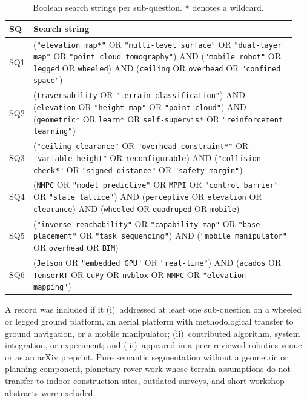 \documentclass[11pt,a4paper]{article}
\begin{document}
\begin{table}[h]
\centering
\footnotesize
\caption{Boolean search strings per sub-question. \texttt{*} denotes a
wildcard.}
\label{tab:retrieval}
\begin{tabular}{@{}p{0.04\linewidth}p{0.90\linewidth}@{}}
\toprule
SQ & Search string \\
\midrule
SQ1 & (\texttt{"elevation map*"} OR \texttt{"multi-level surface"} OR
       \texttt{"dual-layer map"} OR \texttt{"point cloud tomography"}) AND
       (\texttt{"mobile robot"} OR \texttt{legged} OR \texttt{wheeled}) AND
       (\texttt{ceiling} OR \texttt{overhead} OR \texttt{"confined space"}) \\
SQ2 & (\texttt{traversability} OR \texttt{"terrain classification"}) AND
       (\texttt{elevation} OR \texttt{"height map"} OR \texttt{"point cloud"})
       AND (\texttt{geometric*} OR \texttt{learn*} OR \texttt{self-supervis*}
       OR \texttt{"reinforcement learning"}) \\
SQ3 & (\texttt{"ceiling clearance"} OR \texttt{"overhead constraint*"} OR
       \texttt{"variable height"} OR \texttt{reconfigurable}) AND
       (\texttt{"collision check*"} OR \texttt{"signed distance"} OR
       \texttt{"safety margin"}) \\
SQ4 & (\texttt{NMPC} OR \texttt{"model predictive"} OR \texttt{MPPI} OR
       \texttt{"control barrier"} OR \texttt{"state lattice"}) AND
       (\texttt{perceptive} OR \texttt{elevation} OR \texttt{clearance}) AND
       (\texttt{wheeled} OR \texttt{quadruped} OR \texttt{mobile}) \\
SQ5 & (\texttt{"inverse reachability"} OR \texttt{"capability map"} OR
       \texttt{"base placement"} OR \texttt{"task sequencing"}) AND
       (\texttt{"mobile manipulator"} OR \texttt{overhead} OR \texttt{BIM}) \\
SQ6 & (\texttt{Jetson} OR \texttt{"embedded GPU"} OR \texttt{"real-time"}) AND
       (\texttt{acados} OR \texttt{TensorRT} OR \texttt{CuPy} OR
       \texttt{nvblox} OR \texttt{NMPC} OR \texttt{"elevation mapping"}) \\
\bottomrule
\end{tabular}
\end{table}

A record was included if it (i)~addressed at least one sub-question on a wheeled or legged ground platform, an aerial platform with methodological transfer to ground navigation, or a mobile manipulator; (ii)~contributed algorithm, system integration, or experiment; and (iii)~appeared in a peer-reviewed robotics venue or as an arXiv preprint. Pure semantic segmentation without a geometric or planning component, planetary-rover work whose terrain assumptions do not transfer to indoor construction sites, outdated surveys, and short workshop abstracts were excluded.
\end{document}
